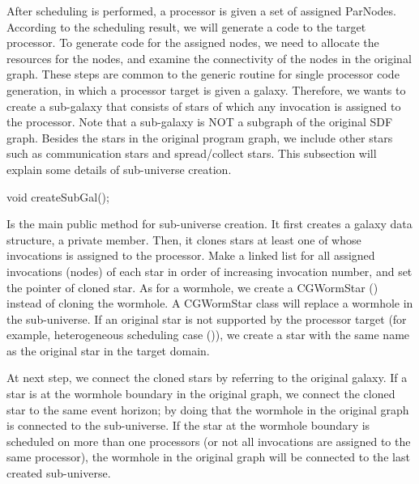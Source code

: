 After scheduling is performed, a processor is given a set of assigned 
ParNodes. According to the scheduling result, we will generate a code
to the target processor. To generate code for the assigned nodes, we need
to allocate the resources for the nodes, and examine the connectivity of
the nodes in the original graph. These steps are common to the generic
routine for single processor code generation, in which a processor target
is given a galaxy. Therefore, we wants to create a sub-galaxy
that consists of stars of which any invocation is assigned to the processor.
Note that a sub-galaxy is NOT a subgraph of the original SDF graph.
Besides the stars in the original program graph, we include other
stars such as communication stars and spread/collect stars. This subsection
will explain some details of sub-universe creation.

\begin{example}
void createSubGal();
\end{example}

Is the main public method for sub-universe creation. It first creates
a galaxy data structure,  a private member. Then, it clones
stars at least one of whose invocations is assigned to the processor.
Make a linked list for all assigned invocations (nodes) of each star 
in order of increasing invocation number, and set the pointer of cloned
star. As for a wormhole, we create a CGWormStar ()
instead of cloning the wormhole. A CGWormStar class will replace a
wormhole in the sub-universe. If an original star is not supported by the
processor target (for example, heterogeneous scheduling case
()), we create
a star with the same name as the original star in the target domain.

At next step, we connect the cloned stars by referring to the original
galaxy. If a star is at the wormhole boundary in the original graph,
we connect the cloned star to the same event horizon; by doing that
the wormhole in the original graph is connected to the sub-universe.
If the star at the wormhole boundary is scheduled on more than one
processors (or not all invocations are assigned to the same processor),
the wormhole in the original graph will be connected to the last
created sub-universe. 


